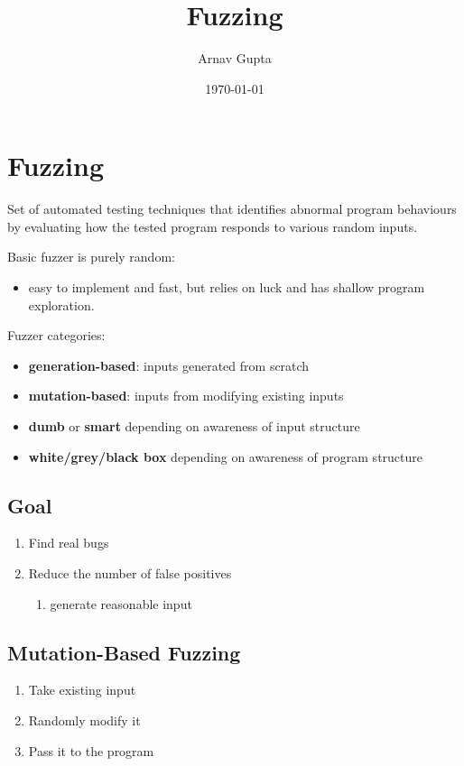 \documentclass[11pt]{article}
\author{Arnav Gupta}
\date{\today}
\title{Fuzzing}
\begin{document}
\maketitle
\tableofcontents

\section{Fuzzing}
\label{sec:org4902d0a}
Set of automated testing techniques that identifies abnormal program behaviours by
evaluating how the tested program responds to various random inputs.

Basic fuzzer is purely random:
\begin{itemize}
\item easy to implement and fast, but relies on luck and has shallow program exploration.
\end{itemize}

Fuzzer categories:
\begin{itemize}
\item \textbf{generation-based}: inputs generated from scratch
\item \textbf{mutation-based}: inputs from modifying existing inputs
\item \textbf{dumb} or \textbf{smart} depending on awareness of input structure
\item \textbf{white/grey/black box} depending on awareness of program structure
\end{itemize}
\subsection{Goal}
\label{sec:org3433d56}
\begin{enumerate}
\item Find real bugs
\item Reduce the number of false positives
\begin{enumerate}
\item generate reasonable input
\end{enumerate}
\end{enumerate}
\subsection{Mutation-Based Fuzzing}
\label{sec:orge950eef}
\begin{enumerate}
\item Take existing input
\item Randomly modify it
\item Pass it to the program
\end{enumerate}
\end{document}
